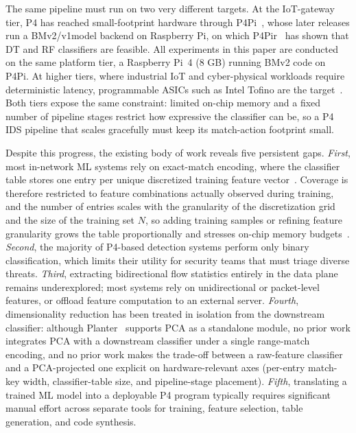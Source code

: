 \documentclass[runningheads]{llncs}
\begin{document}
The same pipeline must run on two very different targets. At the IoT-gateway tier, P4 has reached small-footprint hardware through P4Pi~\cite{Laki2021p4pi}, whose later releases run a BMv2/v1model backend on Raspberry Pi, on which P4Pir~\cite{Zang20249244} has shown that DT and RF classifiers are feasible. All experiments in this paper are conducted on the same platform tier, a Raspberry Pi~4 (8 GB) running BMv2 code on P4Pi. At higher tiers, where industrial IoT and cyber-physical workloads require deterministic latency, programmable ASICs such as Intel Tofino are the target~\cite{Akem2024}. Both tiers expose the same constraint: limited on-chip memory and a fixed number of pipeline stages restrict how expressive the classifier can be, so a P4 IDS pipeline that scales gracefully must keep its match-action footprint small.

Despite this progress, the existing body of work reveals five persistent gaps. \emph{First}, most in-network ML systems rely on exact-match encoding, where the classifier table stores one entry per unique discretized training feature vector~\cite{Lee202523143,Zheng20242,Zheng20242555}. Coverage is therefore restricted to feature combinations actually observed during training, and the number of entries scales with the granularity of the discretization grid and the size of the training set $N$, so adding training samples or refining feature granularity grows the table proportionally and stresses on-chip memory budgets~\cite{Bosshart2013}. \emph{Second}, the majority of P4-based detection systems perform only binary classification, which limits their utility for security teams that must triage diverse threats. \emph{Third}, extracting bidirectional flow statistics entirely in the data plane remains underexplored; most systems rely on unidirectional or packet-level features, or offload feature computation to an external server. \emph{Fourth}, dimensionality reduction has been treated in isolation from the downstream classifier: although Planter~\cite{Zheng20242} supports PCA as a standalone module, no prior work integrates PCA with a downstream classifier under a single range-match encoding, and no prior work makes the trade-off between a raw-feature classifier and a PCA-projected one explicit on hardware-relevant axes (per-entry match-key width, classifier-table size, and pipeline-stage placement). \emph{Fifth}, translating a trained ML model into a deployable P4 program typically requires significant manual effort across separate tools for training, feature selection, table generation, and code synthesis.
\end{document}
